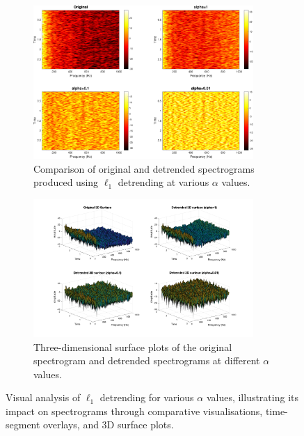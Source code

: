 \begin{figure}
    \ContinuedFloat
    \begin{subfigure}[t]{\textwidth}
        \centering
        \includegraphics[width=0.92\textwidth]{img/ch5/example_l1_plots/spec_comparison.pdf}
        \caption{Comparison of original and detrended spectrograms produced using $\ell_1$ detrending at various $\alpha$ values.}
        \label{fig:l1:spectrogram-comparison}
    \end{subfigure}
    
    \vspace{1cm}
    
    \begin{subfigure}[t]{\textwidth}
        \centering
        \includegraphics[trim={3cm 1.5cm 2.5cm 1cm},clip,width=0.92\textwidth]{img/ch5/example_l1_plots/3d_plot.pdf} %
        \caption{Three-dimensional surface plots of the original spectrogram and detrended spectrograms at different $\alpha$ values.}
        \label{fig:l1:3d}
    \end{subfigure}
    \caption{Visual analysis of $\ell_1$ detrending for various $\alpha$ values, illustrating its impact on spectrograms through comparative visualisations, time-segment overlays, and 3D surface plots.}
    \label{fig:l1:overview}
\end{figure}

